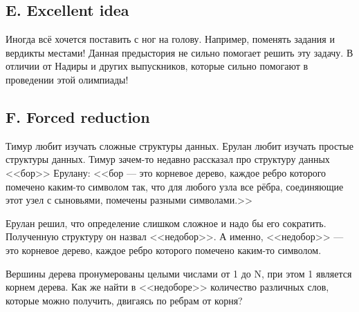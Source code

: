 







\subsection*{E. Excellent idea}
 


Иногда всё хочется поставить с ног на голову. Например, поменять задания и вердикты местами! Данная предыстория не сильно помогает решить эту задачу. В отличии от Надиры и других выпускников, которые сильно помогают в проведении этой олимпиады!






\subsection*{F. Forced reduction}
 

Тимур любит изучать сложные структуры данных. Ерулан любит изучать простые структуры данных. Тимур зачем-то недавно рассказал про структуру данных <<бор>> Ерулану: <<бор --- это корневое дерево, каждое ребро которого помечено каким-то символом так, что для любого узла все рёбра, соединяющие этот узел с сыновьями, помечены разными символами.>>

Ерулан решил, что определение слишком сложное и надо бы его сократить. Полученную структуру он назвал <<недобор>>. А именно, <<недобор>> --- это корневое дерево, каждое ребро которого помечено каким-то символом.

Вершины дерева пронумерованы целыми числами от 1 до N, при этом 1 является корнем дерева. Как же найти в <<недоборе>> количество различных слов, которые можно получить, двигаясь по ребрам от корня? 

